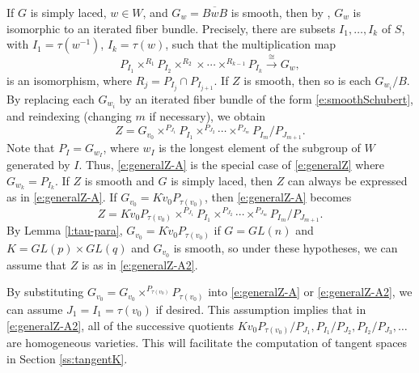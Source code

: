 \documentclass[11pt,letterpaper,reqno]{amsart}
\numberwithin{equation}{section}
\theoremstyle{plain}
\theoremstyle{definition}
\theoremstyle{remark}
\begin{document}
If $G$ is simply laced, $w \in W$, and $G_w = \overline{BwB}$ is smooth, then 
by \cite[Theorem 5.5]{Lar2024}, $G_w$ is isomorphic to
an iterated fiber bundle.  Precisely, there are subsets $I_1, \ldots, I_k$ of $S$,
with $I_1 = \tau(w^{-1})$, $I_k = \tau(w)$, such that the multiplication map
\begin{equation} \label{e:smoothSchubert}
P_{I_1} \times^{R_1} P_{I_2} \times^{R_2} \times \cdots \times^{R_{k-1}} P_{I_k} \stackrel{\cong}{\longrightarrow} G_w,
\end{equation}
is an isomorphism, where
$R_j = P_{I_j} \cap P_{I_{j+1}}$.  If $Z$ is smooth, then so is each $G_{w_i}/B$.  
By replacing each $G_{w_i}$ by an iterated fiber
bundle of the form \eqref{e:smoothSchubert}, and reindexing (changing $m$ if necessary), we obtain
\begin{equation}\label{e:generalZ-A}
Z= G_{v_0} \times^{P_{J_1}} P_{I_1} \times^{P_{J_2}} \cdots \times^{P_{J_m}} P_{I_m}/P_{J_{m+1}}.
\end{equation}
Note that $P_{I} = G_{w_I}$, where $w_I$ is the longest element of the subgroup of $W$ generated by $I$.
Thus, \eqref{e:generalZ-A} is the special case of \eqref{e:generalZ} where $G_{w_k} = P_{I_k}$.  
If $Z$ is smooth and $G$ is simply laced, then $Z$ can always be expressed
as in \eqref{e:generalZ-A}.  
If $G_{v_0} = K \dot{v}_0 P_{\tau(v_0)}$, then 
\eqref{e:generalZ-A} becomes
\begin{equation}\label{e:generalZ-A2}
Z=  K \dot{v}_0 P_{\tau(v_0)} \times^{P_{J_1}} P_{I_1} \times^{P_{J_2}} \cdots \times^{P_{J_m}} P_{I_m}/P_{J_{m+1}}.
\end{equation}
By Lemma \ref{l:tau-para}, $G_{v_0} = K \dot{v}_0 P_{\tau(v_0)}$ if $G = GL(n)$ and $K = GL(p) \times GL(q)$
and $G_{v_0}$ is smooth, so under these hypotheses, we can assume that $Z$ is as in \eqref{e:generalZ-A2}.

By substituting $G_{v_0} = G_{v_0}  \times^{P_{\tau(v_0)}} P_{\tau(v_0)}$ into \eqref{e:generalZ-A} 
or \eqref{e:generalZ-A2}, we can assume $J_1 = I_1 = \tau(v_0)$ if desired.  This assumption implies
that in \eqref{e:generalZ-A2}, all of the successive quotients $K v_0 P_{\tau(v_0)} /P_{J_1}, P_{I_1} /P_{J_2}, P_{I_2}/P_{J_3}, \ldots$ are homogeneous varieties.
This will facilitate the computation of tangent spaces in Section \ref{ss:tangentK}.
\end{document}
